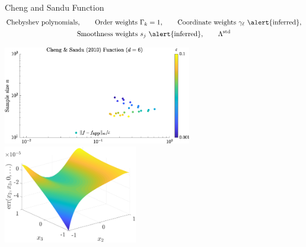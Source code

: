 \documentclass[11pt,compress,xcolor={usenames,dvipsnames},aspectratio=169]{beamer}
\newcommand{\LambdaStd}{\Lambda^{\textup{std}}}
\begin{document}
\begin{frame}{Cheng and Sandu Function}
    \vspace{-9ex}
    \begin{gather*}
        \text{Chebyshev polynomials}, \qquad \text{Order weights }\Gamma_k = 1, \qquad \text{Coordinate weights } \gamma_\ell \text{ \alert{inferred}}, \\
        \text{Smoothness weights } s_j \text{ \alert{inferred}}, \qquad \LambdaStd
    \end{gather*}
    
    \vspace{-3ex}
    
    \includegraphics[height = 4.3cm]{ProgramsImages/sim_eval_results_chsan10_d6_sflg0ErrN.eps}
    \qquad \includegraphics[height = 4.3cm]{ProgramsImages/sim_eval_results_chsan10_d6_sflg0fErr.eps}
\end{frame}
\end{document}
